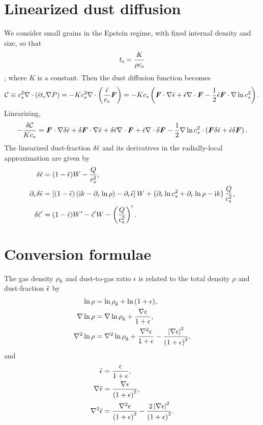 \section{Linearized dust diffusion}\label{lin_dust}
We consider small grains in the Epstein regime, with fixed internal
density and size, so that
\begin{align}
  t_\mathrm{s}  =  \frac{K}{\rho c_s}
\end{align}
\citep{price15}, where $K$ is a constant. Then the dust diffusion
function becomes
\begin{align}
  \mathcal{C} \equiv c_s^2\nabla\cdot\left(\tilde{\epsilon}t_\mathrm{s}\nabla
  P\right) = - K c_s^2 \nabla\cdot
  \left(\frac{\tilde{\epsilon}}{c_s}\bm{F}\right) =
  -Kc_s \left(\bm{F}\cdot\nabla\tilde{\epsilon} + \tilde{\epsilon} \nabla\cdot\bm{F}
  - \frac{1}{2}\tilde{\epsilon}\bm{F}\cdot\nabla\ln{c_s^2}\right).  
\end{align}
Linearizing,
\begin{align}
  - \frac{\delta\mathcal{C}}{Kc_s} = \bm{F}\cdot\nabla\delta\tilde{\epsilon} +
  \delta\bm{F}\cdot\nabla\tilde{\epsilon} + \delta\tilde{\epsilon}\nabla\cdot\bm{F} +
  \tilde{\epsilon}\nabla\cdot\delta\bm{F} -
  \frac{1}{2}\nabla\ln{c_s^2}\cdot\left(\bm{F}\delta\tilde{\epsilon} + \tilde{\epsilon}
  \delta\bm{F}\right). 
\end{align}
The linearized dust-fraction $\delta\tilde{\epsilon}$ and its derivatives in the
radially-local approximation are given by
\begin{align}
  \delta\tilde{\epsilon}      &= (1-\tilde{\epsilon})W - \frac{Q}{c_s^2}, \\
  \partial_r\delta\tilde{\epsilon} &= \left[(1-\tilde{\epsilon})\left(\mathrm{i} k -
    \partial_r\ln{\rho}\right) - \partial_r\tilde{\epsilon}\right]W + \left(\partial_r\ln{c_s^2}
  + \partial_r\ln{\rho} - \mathrm{i} k \right)\frac{Q}{c_s^2},\\
  \delta\tilde{\epsilon}^\prime &= (1-\tilde{\epsilon})W^\prime - \tilde{\epsilon}^\prime W -
  \left(\frac{Q}{c_s^2}\right)^\prime. 
\end{align}




\section{Conversion formulae}
The gas density $\rho_\mathrm{g}$ and dust-to-gas ratio $\epsilon$ is related
to the total density $\rho$ and dust-fraction $\tilde{\epsilon}$ by
\begin{align}
  \ln{\rho} &= \ln{\rho_\mathrm{g}} + \ln{\left(1 + \epsilon\right)},\\
  \nabla\ln{\rho} &= \nabla\ln{\rho_\mathrm{g}} + \frac{\nabla\epsilon}{1+
    \epsilon},\\
  \nabla^2\ln{\rho} &= \nabla^2\ln{\rho_\mathrm{g}} +
  \frac{\nabla^2\epsilon}{1+\epsilon} -
  \frac{\left|\nabla\epsilon\right|^2}{\left(1+\epsilon\right)^2}, 
\end{align}
and
\begin{align}
  \tilde{\epsilon} &= \frac{\epsilon}{1+ \epsilon},\\
 \nabla\tilde{\epsilon} & =
 \frac{\nabla\epsilon}{\left(1+\epsilon\right)^2},\\
 \nabla^2\tilde{\epsilon} &=
 \frac{\nabla^2\epsilon}{\left(1+\epsilon\right)^2} -
 \frac{2\left|\nabla\epsilon\right|^2}{\left(1+\epsilon\right)^3}. 
\end{align}
